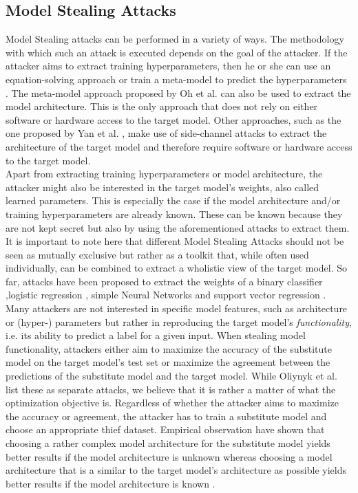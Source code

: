 \subsection{Model Stealing Attacks}
\label{sec:ModelStealing:Attacks}
Model Stealing attacks can be performed in a variety of ways. The methodology with which such an attack is executed depends on the goal of the attacker. If the attacker
aims to extract training hyperparameters, then he or she can use an equation-solving approach \cite{wang2018stealing} or train a meta-model to predict the hyperparameters
\cite{oh2019towards}. The meta-model approach proposed by Oh et al. can also be used to extract the model architecture. This is the only approach that does not rely on either
software or hardware access to the target model. Other approaches, such as the one proposed by Yan et al. \cite{yan2020cache}, make use of side-channel attacks to extract
the architecture of the target model and therefore require software or hardware access to the target model. \\
Apart from extracting training hyperparameters or model architecture, the attacker might also be interested in the target model's weights, also called learned parameters. This
is especially the case if the model architecture and/or training hyperparameters are already known. These can be known because they are not kept secret but also by using the 
aforementioned attacks to extract them. It is important to note here that different Model Stealing Attacks should not be seen as mutually exclusive but rather as a toolkit that,
while often used individually, can be combined to extract a wholistic view of the target model. So far, attacks have been proposed to extract the weights of a binary classifier
\cite{lowd2005adversarial},logistic regression \cite{tramer2016stealing}, simple Neural Networks \cite{tramer2016stealing} and support vector regression \cite{reith2019efficiently}. \\
Many attackers are not interested in specific model features, such as architecture or (hyper-) parameters but rather in reproducing the target model's \textit{functionality}, i.e.
its ability to predict a label for a given input. When stealing model functionality, attackers either aim to maximize the accuracy of the substitute model on the target model's
test set or maximize the agreement between the predictions of the substitute model and the target model. While Oliynyk et al. list these as separate attacks, we believe that it is
rather a matter of what the optimization objective is. Regardless of whether the attacker aims to maximize the accuracy or agreement, the attacker has to train a substitute model
and choose an appropriate thief dataset. Empirical observation have shown that choosing a rather complex model architecture for the substitute model yields better results if the
model architecture is unknown whereas choosing a model architecture that is a similar to the target model's architecture as possible yields better results if the model architecture
is known \cite{orekondy2019knockoff} \cite{pal2020activethief}. \\

